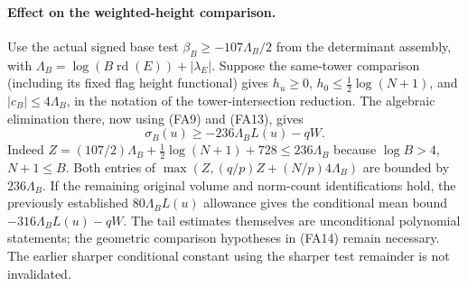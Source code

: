 \paragraph{Effect on the weighted-height comparison.}
Use the actual signed base test
\(\beta_B\ge-107\Lambda_B/2\) from the determinant assembly,
with \(\Lambda_B=\log(B\operatorname{rd}(E))+|\lambda_E|\).
Suppose the same-tower comparison (including its fixed flag
height functional) gives \(h_u\ge0\),
\(h_0\le\frac12\log(N+1)\), and \(|c_B|\le4\Lambda_B\),
in the notation of the tower-intersection reduction.
The algebraic elimination there, now using (FA9) and (FA13), gives
\[
 \sigma_B(u)\ge-236\Lambda_B L(u)-qW .
 \tag{FA14}
\]
Indeed \(Z=(107/2)\Lambda_B+\frac12\log(N+1)+728
\le236\Lambda_B\) because \(\log B>4\), \(N+1\le B\).
Both entries of \(\max(Z,(q/p)Z+(N/p)4\Lambda_B)\)
are bounded by \(236\Lambda_B\).
If the remaining original volume and norm-count identifications hold,
the previously established \(80\Lambda_B L(u)\) allowance gives
the conditional mean bound \(-316\Lambda_B L(u)-qW\).
The tail estimates themselves are unconditional polynomial statements;
the geometric comparison hypotheses in (FA14) remain necessary.
The earlier sharper conditional constant using the sharper test
remainder is not invalidated.
